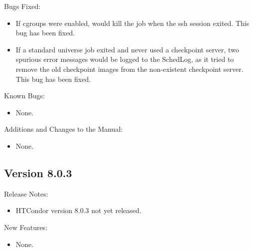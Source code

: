 \noindent Bugs Fixed:

\begin{itemize}

\item If cgroups were enabled,  would
kill the job when the ssh session exited.  This bug has been fixed.

\item If a standard universe job exited and never used a checkpoint
server, two spurious error messages would be logged to the 
SchedLog, as it tried to remove the old checkpoint images from the
non-existent checkpoint server.  This bug has been fixed.

\end{itemize}

\noindent Known Bugs:

\begin{itemize}

\item None.

\end{itemize}

\noindent Additions and Changes to the Manual:

\begin{itemize}

\item None.

\end{itemize}


\subsection*{\label{sec:New-8-0-3}Version 8.0.3}

\noindent Release Notes:

\begin{itemize}

\item HTCondor version 8.0.3 not yet released.

\end{itemize}


\noindent New Features:

\begin{itemize}

\item None.

\end{itemize}

